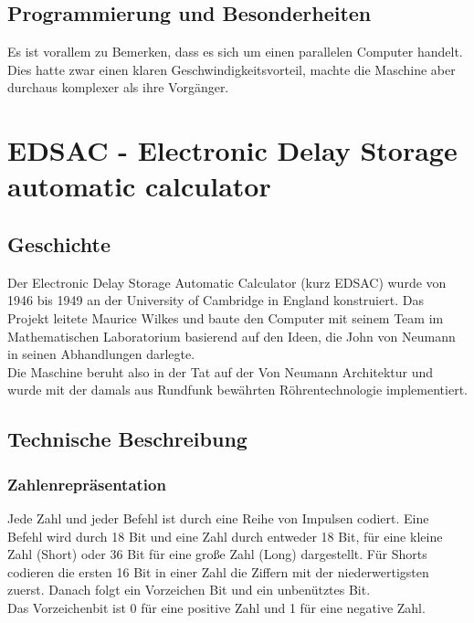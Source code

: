 \documentclass[12pt]{report}
\begin{document}
\subsection{Programmierung und Besonderheiten}

Es ist vorallem zu Bemerken, dass es sich um einen parallelen Computer handelt. Dies hatte zwar einen klaren Geschwindigkeitsvorteil, machte die Maschine aber durchaus komplexer als ihre Vorgänger.

\section{EDSAC - Electronic Delay Storage automatic calculator}

\subsection{Geschichte}

Der Electronic Delay Storage Automatic Calculator (kurz EDSAC) wurde von 1946 bis 1949 an der University of Cambridge in England konstruiert. Das Projekt leitete Maurice Wilkes und baute den Computer mit seinem Team im Mathematischen Laboratorium basierend auf den Ideen, die John von Neumann in seinen Abhandlungen darlegte.\\
Die Maschine beruht also in der Tat auf der Von Neumann Architektur und wurde mit der damals aus Rundfunk bewährten Röhrentechnologie implementiert.\\

\subsection{Technische Beschreibung}

\subsubsection{Zahlenrepräsentation}

Jede Zahl und jeder Befehl ist durch eine Reihe von Impulsen codiert. Eine Befehl wird durch 18 Bit und eine Zahl durch entweder 18 Bit, für eine kleine Zahl (Short) oder 36 Bit für eine große Zahl (Long) dargestellt. Für Shorts codieren die ersten 16 Bit in einer Zahl die Ziffern mit der niederwertigsten zuerst. Danach folgt ein Vorzeichen Bit und ein unbenütztes Bit.\\
Das Vorzeichenbit ist 0 für eine positive Zahl und 1 für eine negative Zahl.\\
\end{document}
